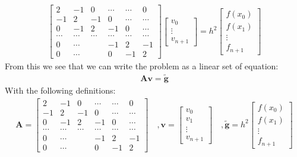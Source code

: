 \documentclass[american,a4paper,12pt]{article}
\renewcommand{\vec}[1]{\mathbf{#1}} %
\begin{document}
  \begin{align*}
        \begin{bmatrix}
          2 & -1 & 0 & \cdots & \cdots & 0 \\
          -1 & 2 & -1 & 0 & \cdots & \cdots \\
          0 & -1 & 2 & -1 & 0 & \cdots \\
          \cdots & \cdots & \cdots & \cdots & \cdots & \cdots \\
          0 & \cdots & & -1 & 2 & -1 \\
          0 & \cdots & & 0 & -1 & 2
        \end{bmatrix}
        \begin{bmatrix}
          v_0 \\
          \vdots \\
          v_{n+1}
        \end{bmatrix}
  = h^2
        \begin{bmatrix}
          f(x_0) \\
          f(x_1) \\
          \vdots \\
          f_{n+1}
        \end{bmatrix}
  \end{align*}
  From this we see that we can write the problem as a linear set of equation:
  \begin{align*}
    \vec{A}\vec{v} = \vec{\tilde{g}}
  \end{align*}
  With the following definitions:
  \begin{align*}
    \vec{A} =
    \begin{bmatrix}
      2 & -1 & 0 & \cdots & \cdots & 0 \\
      -1 & 2 & -1 & 0 & \cdots & \cdots \\
      0 & -1 & 2 & -1 & 0 & \cdots \\
      \cdots & \cdots & \cdots & \cdots & \cdots & \cdots \\
      0 & \cdots & & -1 & 2 & -1 \\
      0 & \cdots & & 0 & -1 & 2
    \end{bmatrix}
    \quad, \vec{v} =
    \begin{bmatrix}
      v_0 \\
      v_1 \\
      \vdots \\
      v_{n+1}
    \end{bmatrix}
    \quad, \vec{\tilde{g}} = h^2
    \begin{bmatrix}
      f(x_0) \\
      f(x_1) \\
      \vdots \\
      f_{n+1}
    \end{bmatrix}
  \end{align*}
\end{document}
